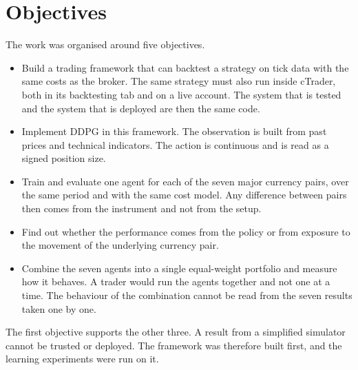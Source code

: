 \section{Objectives}

The work was organised around five objectives.

\begin{itemize}
\item Build a trading framework that can backtest a strategy on tick data with the same costs as the broker. The same strategy must also run inside cTrader, both in its backtesting tab and on a live account. The system that is tested and the system that is deployed are then the same code.
\item Implement DDPG in this framework. The observation is built from past prices and technical indicators. The action is continuous and is read as a signed position size.
\item Train and evaluate one agent for each of the seven major currency pairs, over the same period and with the same cost model. Any difference between pairs then comes from the instrument and not from the setup.
\item Find out whether the performance comes from the policy or from exposure to the movement of the underlying currency pair.
\item Combine the seven agents into a single equal-weight portfolio and measure how it behaves. A trader would run the agents together and not one at a time. The behaviour of the combination cannot be read from the seven results taken one by one.
\end{itemize}

The first objective supports the other three. A result from a simplified simulator cannot be trusted or deployed. The framework was therefore built first, and the learning experiments were run on it.